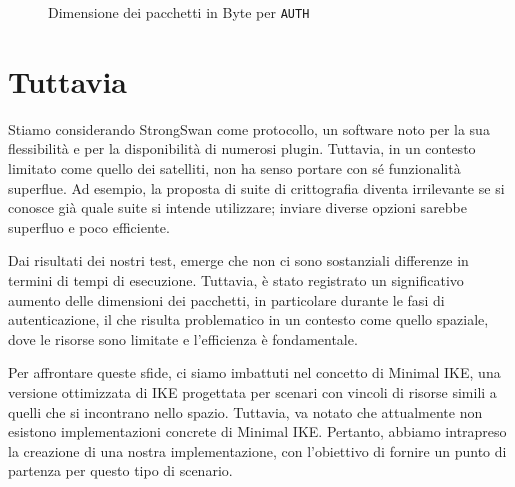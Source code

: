 \begin{figure}[h!] 
    \centering 
    \caption{Dimensione dei pacchetti in Byte per \texttt{AUTH}}
    \label{fig:dimensioni_pacchetti} 
\end{figure}




\section{Tuttavia}

Stiamo considerando StrongSwan come protocollo, un software noto per la sua
flessibilità e per la disponibilità di numerosi plugin. Tuttavia, in un contesto
limitato come quello dei satelliti, non ha senso portare con sé funzionalità
superflue. Ad esempio, la proposta di suite di crittografia diventa irrilevante
se si conosce già quale suite si intende utilizzare; inviare diverse opzioni
sarebbe superfluo e poco efficiente.

Dai risultati dei nostri test, emerge che non ci sono sostanziali differenze in
termini di tempi di esecuzione. Tuttavia, è stato registrato un significativo
aumento delle dimensioni dei pacchetti, in particolare durante le fasi di
autenticazione, il che risulta problematico in un contesto come quello spaziale,
dove le risorse sono limitate e l'efficienza è fondamentale.

Per affrontare queste sfide, ci siamo imbattuti nel concetto di Minimal IKE,
una versione ottimizzata di IKE progettata per scenari con vincoli di risorse
simili a quelli che si incontrano nello spazio. Tuttavia, va notato che
attualmente non esistono implementazioni concrete di Minimal IKE\@. Pertanto,
abbiamo intrapreso la creazione di una nostra implementazione, con l'obiettivo
di fornire un punto di partenza per questo tipo di scenario.

